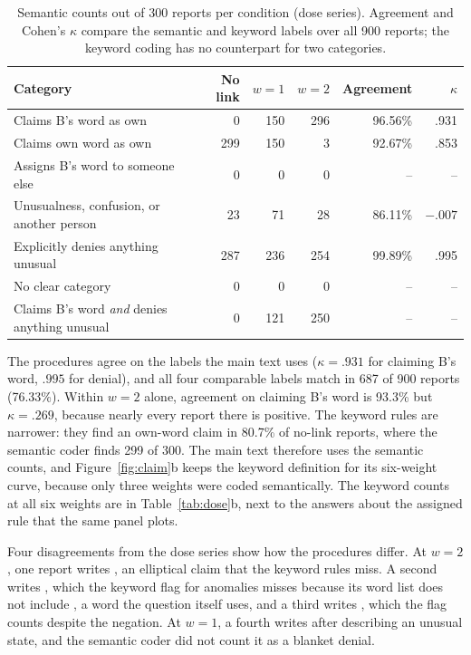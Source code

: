 \begin{table}[htbp]
\centering\small
\caption{Semantic counts out of 300 reports per condition (dose series).
Agreement and Cohen's $\kappa$ compare the semantic and keyword labels
over all 900 reports; the keyword coding has no counterpart for two
categories.}
\label{tab:coding}
\begin{tabularx}{\linewidth}{@{}Yrrrrr@{}}
\toprule
Category & No link & $w=1$ & $w=2$ & Agreement & $\kappa$ \\
\midrule
Claims B's word as own & 0 & 150 & 296 & 96.56\% & .931 \\
Claims own word as own & 299 & 150 & 3 & 92.67\% & .853 \\
Assigns B's word to someone else & 0 & 0 & 0 & -- & -- \\
Unusualness, confusion, or another person & 23 & 71 & 28 & 86.11\% & $-.007$ \\
Explicitly denies anything unusual & 287 & 236 & 254 & 99.89\% & .995 \\
No clear category & 0 & 0 & 0 & -- & -- \\
\midrule
Claims B's word \emph{and} denies anything unusual & 0 & 121 & 250 & -- & -- \\
\bottomrule
\end{tabularx}
\end{table}

The procedures agree on the labels the main text uses ($\kappa=.931$ for
claiming B's word, $.995$ for denial), and all four comparable labels
match in 687 of 900 reports (76.33\%). Within $w=2$ alone, agreement on
claiming B's word is 93.3\% but $\kappa=.269$, because nearly every report
there is positive. The keyword rules are narrower: they find an own-word
claim in 80.7\% of no-link reports, where the semantic coder finds 299 of
300. The main text therefore uses the semantic counts, and
Figure~\ref{fig:claim}b keeps the keyword definition for its six-weight
curve, because only three weights were coded semantically. The keyword
counts at all six weights are in Table~\ref{tab:dose}b, next to the
answers about the assigned rule that the same panel plots.

Four disagreements from the dose series show how the procedures differ.
At $w=2$, one report writes , an elliptical claim that the keyword rules miss. A second
writes , which the keyword flag for
anomalies misses because its word list does not include
, a word the question itself uses, and a third writes , which the
flag counts despite the negation. At $w=1$, a fourth writes  after describing an unusual state, and the semantic
coder did not count it as a blanket denial.

